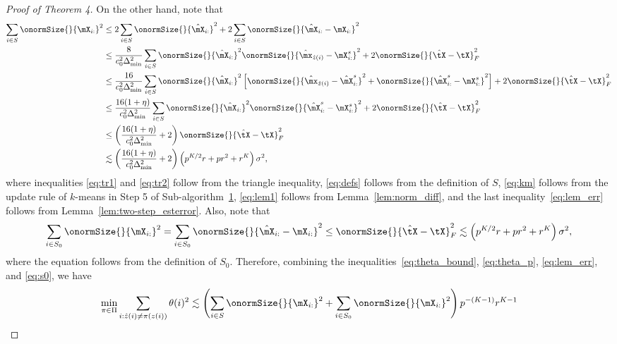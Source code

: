 \documentclass[lettersize,onecolumn,journal]{IEEEtran}
\theoremstyle{definition}
\theoremstyle{definition}
\newcommand{\of}[1]{\left(#1\right)}
\newcommand{\off}[1]{\left[#1\right]}
\begin{document}
\begin{proof}[Proof of Theorem 4]
    On the other hand, note that 
    \begin{align}
         \sum_{i \in S} \onormSize{}{\mX_{i:}}^2 & \leq 2 \sum_{i \in S} \onormSize{}{\hat \mX_{i:}}^2  +  2\sum_{i \in S} \onormSize{}{\hat \mX_{i:} - \mX_{i:}}^2 \label{eq:tr1}\\
         & \leq \frac{8}{c_0^2 \Delta_{\min}^2  } \sum_{i \in S} \onormSize{}{\hat \mX_{i:}}^2   \onormSize{}{\hat \mx_{\hat z(i)} - \mX_{i:}^s }^2 +2 \onormSize{}{\hat \tX - \tX}_F^2 \label{eq:defs} \\
         & \leq \frac{16}{c_0^2 \Delta_{\min}^2  }\sum_{i \in S} \onormSize{}{\hat \mX_{i:}}^2  \off{ \onormSize{}{\hat \mx_{\hat z(i)} - \hat \mX_{i:}^s }^2 + \onormSize{}{\hat \mX_{i:}^s - \mX_{i:}^s }^2 } + 2\onormSize{}{\hat \tX - \tX}_F^2 \label{eq:tr2} \\
         & \leq  \frac{16(1 + \eta)}{c_0^2 \Delta_{\min}^2 }\sum_{i \in S} \onormSize{}{\hat \mX_{i:}}^2  \onormSize{}{\hat \mX_{i:}^s - \mX_{i:}^s }^2  + 2\onormSize{}{\hat \tX - \tX}_F^2 \label{eq:km} \\
         & \leq \of{ \frac{16(1 + \eta)}{c_0^2 \Delta_{\min}^2 } + 2 }\onormSize{}{\hat \tX - \tX}_F^2 \label{eq:lem1}\\
         & \lesssim \of{ \frac{16(1 + \eta)}{c_0^2 \Delta_{\min}^2 } + 2 } \of{ p^{K/2}r + pr^2 + r^K } \sigma^2 \label{eq:lem_err},
    \end{align}
    where inequalities \eqref{eq:tr1} and \eqref{eq:tr2} follow from the triangle inequality, \eqref{eq:defs} follows from the definition of $S$, \eqref{eq:km} follows from the update rule of $k$-means in Step 5 of Sub-algorithm~\hyperref[alg:main]{1}, \eqref{eq:lem1} follows from Lemma~\ref{lem:norm_diff}, and the last inequality~\eqref{eq:lem_err} follows from Lemma~\ref{lem:two-step_esterror}. Also, note that 
    \begin{equation}\label{eq:s0}
         \sum_{i \in S_0} \onormSize{}{\mX_{i:}}^2 =  \sum_{i \in S_0} \onormSize{}{\hat \mX_{i:}- \mX_{i:}}^2 \leq \onormSize{}{\hat \tX - \tX}_F^2 \lesssim \of{ p^{K/2}r + pr^2 + r^K } \sigma^2,
    \end{equation}
    where the equation follows from the definition of $S_0$. Therefore, combining the inequalities~\eqref{eq:theta_bound}, \eqref{eq:theta_p}, \eqref{eq:lem_err}, and \eqref{eq:s0}, we have 
    \begin{align}
        \min_{\pi \in \Pi} \sum_{i : \hat z(i) \neq \pi(z(i))} \theta(i)^2  &\lesssim \of{\sum_{i \in S} \onormSize{}{\mX_{i:}}^2 + \sum_{i \in S_0} \onormSize{}{\mX_{i:}}^2  } p^{-(K-1)} r^{K-1} \\

\end{align}
\end{proof}
\end{document}

